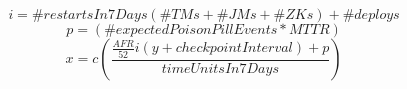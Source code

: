 \documentclass[preview]{standalone}
\begin{document}
\begin{equation}
	i = \# restartsIn7Days \left(\# TMs + \# JMs + \# ZKs\right) + \#deploys
\end{equation}
\begin{equation}
	p = \left(\# expectedPoisonPillEvents * MTTR\right)
\end{equation}
\begin{equation}
	x = c \left(\frac{\frac{AFR}{52} i \left(y + checkpointInterval\right) + p}{timeUnitsIn7Days}\right)
\end{equation}
\end{document}
